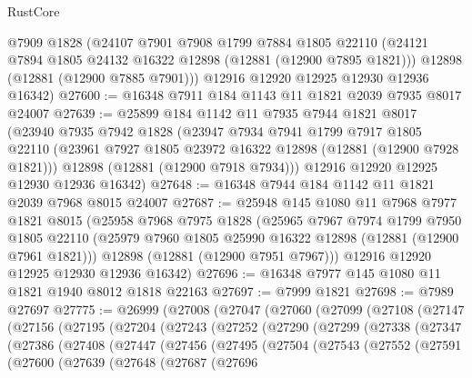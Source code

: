 \begin{lexlean}{RustCore}
\begin{coremodule}
      @7909
      @1828
      (@24107
        @7901
        @7908
        @1799
        @7884
        @1805
        @22110
        (@24121 @7894 @1805 @24132 @16322 @12898 (@12881 (@12900 @7895 @1821)))
        @12898
        (@12881 (@12900 @7885 @7901)))
      @12916
      @12920
      @12925
      @12930
      @12936
      @16342)
@27600 := @16348 @7911 @184 @1143 @11 @1821 @2039 @7935 @8017 @24007
@27639 := @25899
    @184
    @1142
    @11
    @7935
    @7944
    @1821
    @8017
    (@23940
      @7935
      @7942
      @1828
      (@23947
        @7934
        @7941
        @1799
        @7917
        @1805
        @22110
        (@23961 @7927 @1805 @23972 @16322 @12898 (@12881 (@12900 @7928 @1821)))
        @12898
        (@12881 (@12900 @7918 @7934)))
      @12916
      @12920
      @12925
      @12930
      @12936
      @16342)
@27648 := @16348 @7944 @184 @1142 @11 @1821 @2039 @7968 @8015 @24007
@27687 := @25948
    @145
    @1080
    @11
    @7968
    @7977
    @1821
    @8015
    (@25958
      @7968
      @7975
      @1828
      (@25965
        @7967
        @7974
        @1799
        @7950
        @1805
        @22110
        (@25979 @7960 @1805 @25990 @16322 @12898 (@12881 (@12900 @7961 @1821)))
        @12898
        (@12881 (@12900 @7951 @7967)))
      @12916
      @12920
      @12925
      @12930
      @12936
      @16342)
@27696 := @16348 @7977 @145 @1080 @11 @1821 @1940 @8012 @1818 @22163
@27697 := @7999 @1821
@27698 := @7989 @27697
@27775 := @26999
    (@27008
      (@27047
        (@27060
          (@27099
            (@27108
              (@27147
                (@27156
                  (@27195
                    (@27204
                      (@27243
                        (@27252
                          (@27290
                            (@27299
                              (@27338
                                (@27347
                                  (@27386
                                    (@27408
                                      (@27447
                                        (@27456
                                          (@27495
                                            (@27504
                                              (@27543
                                                (@27552
                                                  (@27591
                                                    (@27600
                                                      (@27639
                                                        (@27648
                                                          (@27687
                                                            (@27696

\end{coremodule}
\end{lexlean}
